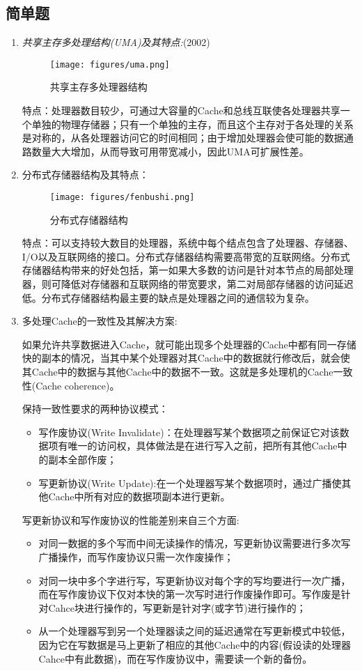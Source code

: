 \documentclass[a4paper]{ctexart}
\begin{document}
\subsection{简单题}
\begin{enumerate}
  \item \emph{共享主存多处理结构(UMA)及其特点:}(2002)
  \begin{figure}[htbp]
    \caption{共享主存多处理器结构}
    \centering
    \texttt{[image: figures/uma.png]}
  \end{figure}
  
  特点：处理器数目较少，可通过大容量的Cache和总线互联使各处理器共享一个单独的物理存储器；只有一个单独的主存，而且这个主存对于各处理的关系是对称的，从各处理器访问它的时间相同；由于增加处理器会使可能的数据通路数量大大增加，从而导致可用带宽减小，因此UMA可扩展性差。
  \item 分布式存储器结构及其特点：
  \begin{figure}[htbp]
    \caption{分布式存储器结构}
    \centering
    \texttt{[image: figures/fenbushi.png]}
  \end{figure}
  
  特点：可以支持较大数目的处理器，系统中每个结点包含了处理器、存储器、I/O以及互联网络的接口。分布式存储器结构需要高带宽的互联网络。分布式存储器结构带来的好处包括，第一如果大多数的访问是针对本节点的局部处理器，则可降低对存储器和互联网络的带宽要求，第二对局部存储器的访问延迟低。分布式存储器结构最主要的缺点是处理器之间的通信较为复杂。

  \item 多处理Cache的一致性及其解决方案:
  
  如果允许共享数据进入Cache，就可能出现多个处理器的Cache中都有同一存储快的副本的情况，当其中某个处理器对其Cache中的数据就行修改后，就会使其Cache中的数据与其他Cache中的数据不一致。这就是多处理机的Cache一致性(Cache coherence)。
  
  保持一致性要求的两种协议模式：
  \begin{itemize}
    \item 写作废协议(Write Invalidate)：在处理器写某个数据项之前保证它对该数据项有唯一的访问权，具体做法是在进行写入之前，把所有其他Cache中的副本全部作废；
    \item 写更新协议(Write Update):在一个处理器写某个数据项时，通过广播使其他Cache中所有对应的数据项副本进行更新。
  \end{itemize}
  写更新协议和写作废协议的性能差别来自三个方面:
  \begin{itemize}
    \item 对同一数据的多个写而中间无读操作的情况，写更新协议需要进行多次写广播操作，而写作废协议只需一次作废操作；
    \item 对同一块中多个字进行写，写更新协议对每个字的写均要进行一次广播，而在写作废协议下仅对本快的第一次写时进行作废操作即可。写作废是针对Cahce块进行操作的，写更新是针对字(或字节)进行操作的；
    \item 从一个处理器写到另一个处理器读之间的延迟通常在写更新模式中较低，因为它在写数据是马上更新了相应的其他Cache中的内容(假设读的处理器Cahce中有此数据)，而在写作废协议中，需要读一个新的备份。
  \end{itemize}
  

\end{enumerate}
\end{document}
